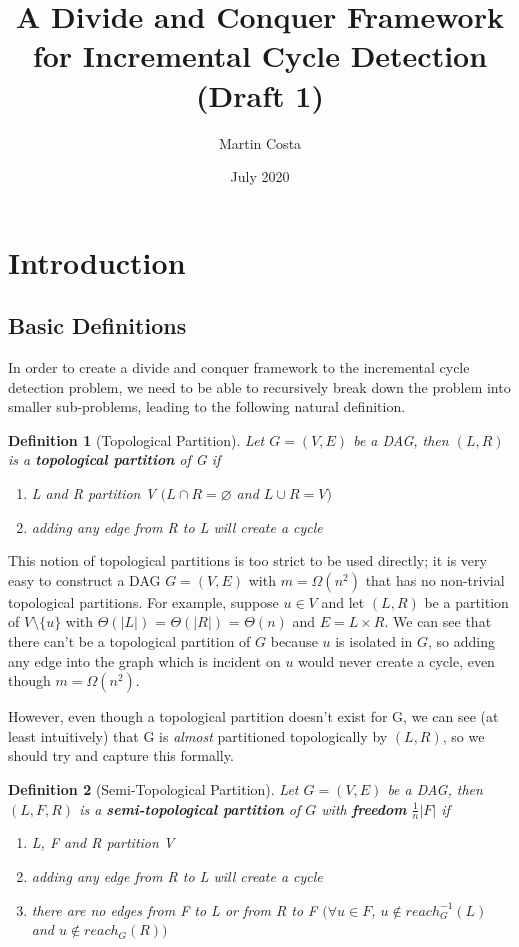 \documentclass{article}
\title{A Divide and Conquer Framework for Incremental Cycle Detection (Draft 1)}
\author{Martin Costa}
\date{July 2020}
\newtheorem{definition}{Definition}
\begin{document}
\maketitle

\section{Introduction}

\subsection{Basic Definitions}

In order to create a divide and conquer framework to the incremental cycle detection problem, we need to be able to recursively break down the problem into smaller sub-problems, leading to the following natural definition.

\begin{definition}[Topological Partition]
Let $G=(V,E)$ be a DAG, then $(L,R)$ is a \textbf{topological partition} of G if
\begin{enumerate}
\item L and R partition V $(L \cap R = \varnothing$ and $L \cup R = V)$
\item adding any edge from R to L will create a cycle
\end{enumerate}
\end{definition}

This notion of topological partitions is too strict to be used directly; it is very easy to construct a DAG $G=(V,E)$ with $m=\Omega (n^{2})$ that has no non-trivial topological partitions. For example, suppose $u \in V$ and let $(L,R)$ be a partition of $V\setminus{\{u\}}$ with $\Theta(\vert L \vert)$ = $\Theta(\vert R \vert)$ = $\Theta(n)$ and $E = L \times R$. We can see that there can't be a topological partition of $G$ because $u$ is isolated in $G$, so adding any edge into the graph which is incident on $u$ would never create a cycle, even though $m=\Omega (n^{2})$.

However, even though a topological partition doesn't exist for G, we can see (at least intuitively) that G is \textit{almost} partitioned topologically by $(L,R)$, so we should try and capture this formally.

\begin{definition}[Semi-Topological Partition]
Let $G=(V,E)$ be a DAG, then $(L,F,R)$ is a \textbf{semi-topological partition} of $G$ with \textbf{freedom} $\frac{1}{n} \vert F \vert$ if
\begin{enumerate}
\item L, F and R partition V
\item adding any edge from R to L will create a cycle
\item there are no edges from F to L or from R to F $(\forall u \in F$, $u \notin reach_{G}^{-1}(L)$ and $u \notin reach_{G}(R))$
\end{enumerate}
\end{definition}
\end{document}
